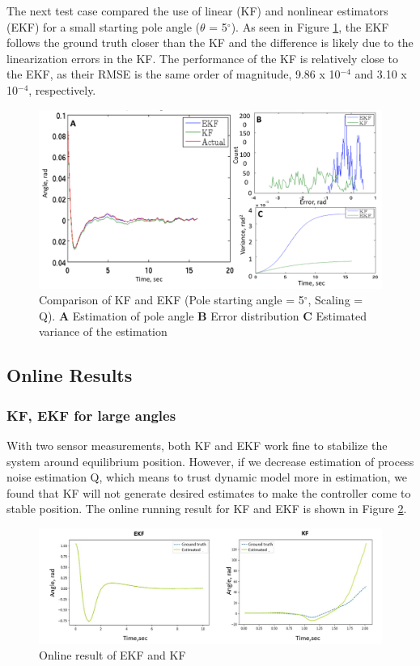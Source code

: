 \documentclass{article}
\begin{document}
 The next test case compared the use of linear (KF) and nonlinear estimators (EKF) for a small starting pole angle ($\theta$ = 5$^{\circ}$).  As seen in Figure \ref{fig:5degKFvEKF}, the EKF follows the ground truth closer than the KF and the difference is likely due to the linearization errors in the KF.  The performance of the KF is relatively close to the EKF, as their RMSE is the same order of magnitude, 9.86 x 10$^{-4}$ and 3.10 x 10$^{-4}$, respectively.
 \begin{figure}[h!]
 	\centering
 	\includegraphics[width=15cm,keepaspectratio]{5degKFvEKF.png}
 	\caption{Comparison of KF and EKF (Pole starting angle = 5$^{\circ}$, Scaling = Q). \textbf{A} Estimation of pole angle \textbf{B} Error distribution \textbf{C} Estimated variance of the estimation}
 	\label{fig:5degKFvEKF}
 \end{figure}
\subsection{Online Results}
\subsubsection{KF, EKF for large angles}
With two sensor measurements, both KF and EKF work fine to stabilize the system around equilibrium position. However, if we decrease estimation of process noise estimation Q, which means to trust dynamic model more in estimation, we found that KF will not generate desired estimates to make the controller come to stable position. The online running result for KF and EKF is shown in Figure \ref{fig:onlineKFvsEKF}. 
\begin{figure}[h!]
	\centering
	\includegraphics[width=15cm,keepaspectratio]{EKFvsKF_online.png}
	\caption{Online result of EKF and KF}
	\label{fig:onlineKFvsEKF}
\end{figure}
\end{document}
